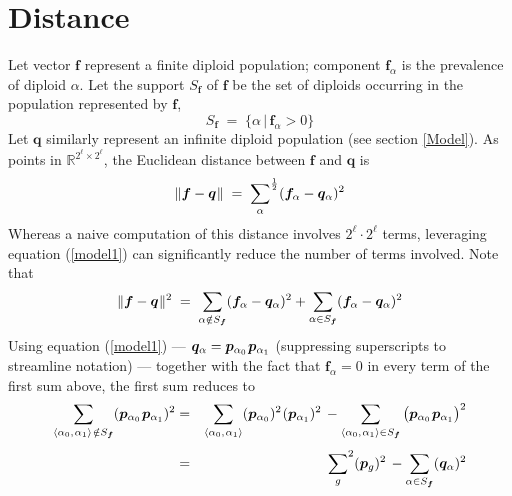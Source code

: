 \section{Distance}
Let vector ${\bm f}$ represent a finite diploid population; component
${\bm f}_\alpha$ is the prevalence of diploid $\alpha$.  Let the
support $S_{\bm f}$ of ${\bm f}$ be the set of diploids occurring in
the population represented by ${\bm f}$,\\[-0.03in]
\[
S_{\bm f} \; = \; \{ \alpha \, | \, {\bm f}_\alpha > 0 \}
\]
Let ${\bm q}$ similarly represent an infinite diploid population (see
section \ref{Model}).  As points in $\mathbb{R}^{2^\ell
  \times 2^\ell}$, the Euclidean distance between ${\bm f}$ and ${\bm
  q}$ is \\[-0.175in]
\[
\|{\bm f} - {\bm q} \hspace{0.005in} \| \; = \;
  {\sum_{\alpha}}^{\frac{1}{2}} ({\bm f}_\alpha-{\bm q}_\alpha)^2\\[-.02in]
\]
Whereas a naive computation of this distance involves ${2^\ell \cdot
  2^\ell}$ terms, leveraging equation (\ref{model1}) can significantly
reduce the number of terms involved.  Note that
\begin{equation} \label{d1}
\|{\bm f} - {\bm q} \hspace{0.005in} \|^2 \; = \;
\sum_{\alpha \notin {S_{\bm f}}} ({\bm f}_\alpha-{\bm q}_\alpha)^2 +
\sum_{\alpha \in {S_{\bm f}}} ({\bm f}_\alpha-{\bm q}_\alpha)^2 \\[-.02in]
\end{equation}
Using equation (\ref{model1}) --- ${\bm q}_\alpha = {\bm p}_{\alpha_0}
\hspace{0.01in} {\bm p}_{\alpha_1}$ (suppressing superscripts to streamline
notation) --- together with the fact that ${\bm f}_\alpha = 0$ in
every term of the first sum above, the first sum reduces to
\begin{eqnarray}
  \sum_{\langle \alpha_0, \hspace{0.01in} \alpha_1 \rangle \hspace{0.01in} \notin
    {S_{\bm f}}} ({\bm p}_{\alpha_0} \hspace{0.01in} {\bm p}_{\alpha_1})^2 & =
  & \sum_{\langle \alpha_0, \hspace{0.01in} \alpha_1 \rangle} ({\bm
    p}_{\alpha_0})^2 \hspace{0.01in} ({\bm p}_{\alpha_1})^2 \, - \sum_{\langle
    \alpha_0, \hspace{0.01in} \alpha_1 \rangle\in {S_{\bm f}}} \big( {\bm
    p}_{\alpha_0}\hspace{0.01in} {\bm p}_{\alpha_1} \big)^2 \nonumber
  \\[0.05in] & = & {\sum_{g}}^2 ({\bm p}_{g})^2 \, - \sum_{\alpha \in
    {S_{\bm f}}} ( {\bm q}_{\alpha})^2
      \label{d2}
\end{eqnarray}
